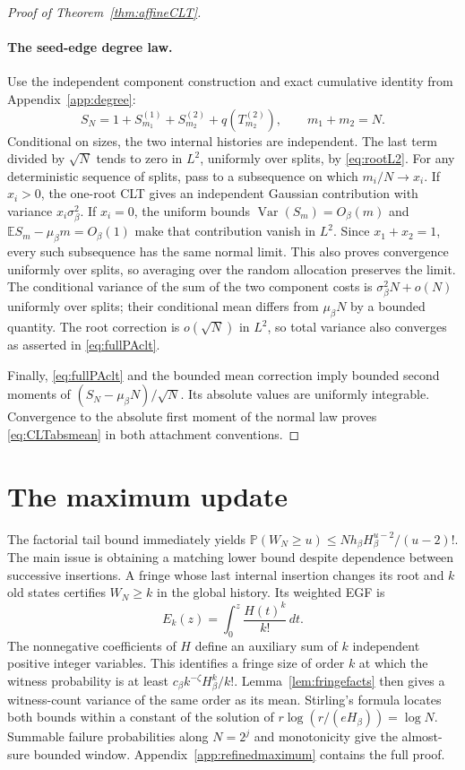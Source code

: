 \documentclass[runningheads,envcountsame,orivec]{llncs}
\newcommand{\E}{\mathbb E}
\newcommand{\PP}{\mathbb P}
\begin{document}
\begin{proof}[Proof of Theorem~\ref{thm:affineCLT}]
\paragraph{The seed-edge degree law.}
Use the independent component construction and exact cumulative
identity from Appendix~\ref{app:degree}:
\[
 S_N=1+S_{m_1}^{(1)}+S_{m_2}^{(2)}+q(T_{m_2}^{(2)}),
 \qquad m_1+m_2=N.
\]
Conditional on sizes, the two internal histories are independent.
The last term divided by $\sqrt N$ tends to zero in $L^2$,
uniformly over splits, by \eqref{eq:rootL2}.
For any deterministic sequence of splits, pass to a subsequence on
which $m_i/N\to x_i$. If $x_i>0$, the one-root CLT gives an
independent Gaussian contribution with variance $x_i\sigma_\beta^2$.
If $x_i=0$, the uniform bounds
$\operatorname{Var}(S_m)=O_\beta(m)$ and
$\E S_m-\mu_\beta m=O_\beta(1)$ make that contribution vanish
in $L^2$. Since $x_1+x_2=1$, every such subsequence has the same
normal limit. This also proves convergence uniformly over splits,
so averaging over the random allocation preserves the limit.
The conditional variance of the sum of the two component costs is
$\sigma_\beta^2N+o(N)$ uniformly over splits; their conditional
mean differs from $\mu_\beta N$ by a bounded quantity.
The root correction is $o(\sqrt N)$ in $L^2$, so total variance
also converges as asserted in \eqref{eq:fullPAclt}.

Finally, \eqref{eq:fullPAclt} and the bounded mean correction imply
bounded second moments of $(S_N-\mu_\beta N)/\sqrt N$.
Its absolute values are uniformly integrable. Convergence to the
absolute first moment of the normal law proves
\eqref{eq:CLTabsmean} in both attachment conventions.
\end{proof}


\section{The maximum update}\label{sec:maximum}

The factorial tail bound immediately yields
$\PP(W_N\ge u)\le Nh_\beta H_\beta^{u-2}/(u-2)!$.
The main issue is obtaining a matching lower bound despite dependence
between successive insertions. A fringe whose last internal insertion
changes its root and $k$ old states certifies $W_N\ge k$ in the
global history. Its weighted EGF is
\[
 E_k(z)=\int_0^z\frac{H(t)^k}{k!}\,dt.
\]
The nonnegative coefficients of $H$ define an auxiliary sum of $k$
independent positive integer variables. This identifies a fringe size
of order $k$ at which the witness probability is at least
$c_\beta k^{-\zeta}H_\beta^k/k!$.
Lemma~\ref{lem:fringefacts} then gives a witness-count variance of
the same order as its mean. Stirling's formula locates both bounds
within a constant of the solution of
$r\log(r/(eH_\beta))=\log N$. Summable failure probabilities along
$N=2^j$ and monotonicity give the almost-sure bounded window.
Appendix~\ref{app:refinedmaximum} contains the full proof.
\end{document}
